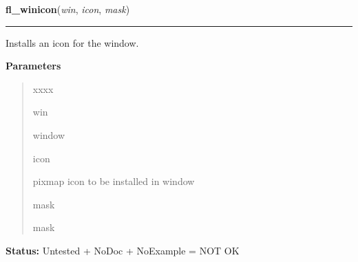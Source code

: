 \hspace{.8\funcindent}\begin{boxedminipage}{\funcwidth}

    \raggedright \textbf{fl\_winicon}(\textit{win}, \textit{icon}, \textit{mask})

    \vspace{-1.5ex}

    \rule{\textwidth}{0.5\fboxrule}
\setlength{\parskip}{2ex}
    Installs an icon for the window.

\setlength{\parskip}{1ex}
      \textbf{Parameters}
      \vspace{-1ex}

      \begin{quote}
        \begin{Ventry}{xxxx}

          \item[win]

          window

          \item[icon]

          pixmap icon to be installed in window

          \item[mask]

          mask

        \end{Ventry}

      \end{quote}

\textbf{Status:} Untested + NoDoc + NoExample = NOT OK



    \end{boxedminipage}

    \label{xformslib:library:fl_winbackground}

    \vspace{0.5ex}

